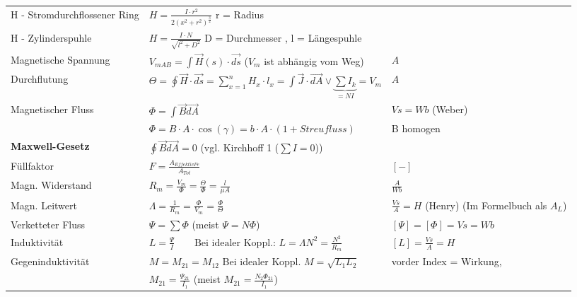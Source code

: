 \begin{tabular}[c]{ | p{5cm} | p{8cm} | p{4cm} | }
            H - Stromdurchflossener Ring & $ H =  \frac{I \cdot r^2}{2(x^2+r^2)^{\frac{3}{2}}}$ r = Radius &  \\
            H - Zylinderspuhle & $ H = \frac{I \cdot N}{\sqrt{l^2 + D^2}}$ D = Durchmesser , l = Längespuhle & \\
            Magnetische Spannung &
            $V_{mAB} = \int\limits \vec{H}(s) \cdot \vec{ds}$ ($V_m$ ist abhängig vom Weg) &
            $A$ \\
            \hline
            Durchflutung &
            $\Theta = \oint\vec{H} \cdot \vec{ds} = \sum\limits_{x=1}^n H_x \cdot l_x = \int\limits \vec{J} \cdot \vec{dA} \vee \underbrace{\sum I_k}_{= N I} = V_m$ &
            $A$ \\
            \hline
            Magnetischer Fluss &
            $\Phi = \int \vec{B} \vec{dA}$ &
            $Vs = Wb$ (Weber) \\
            &
            $\Phi = B \cdot A \cdot \cos(\gamma)=b \cdot A \cdot (1+Streufluss)$ &
            B homogen \\
            \hline
            \textbf{Maxwell-Gesetz} &
            $\oint \vec{B} \vec{dA} = 0$ (vgl. Kirchhoff 1 ($\sum I = 0$)) &
            \\
            \hline
            Füllfaktor &
            $F=\frac{A_{Effektiv Fe}}{A_{Tot}}$ &
            $[-]$ \\
            \hline
            Magn. Widerstand &
            $R_m = \frac{V_m}{\Phi} = \frac{\Theta}{\Phi} = \frac{l}{\mu A} $ &
            $\frac{A}{Wb}$ \\
            \hline
            Magn. Leitwert &
            $\Lambda = \frac{1}{R_m} = \frac{\Phi}{V_m}=\frac{\Phi}{\Theta}$ &
            $\frac{Vs}{A} = H$ (Henry) (Im Formelbuch als $A_L$) \\
            \hline
            Verketteter Fluss &
            $\Psi = \sum \Phi $ (meist $\Psi = N \Phi$) &
            $[\Psi] = [\Phi] = Vs = Wb$ \\
            \hline
            Induktivität &
            $L = \frac{\Psi}{I}  \qquad \text{Bei idealer Koppl.: } L = \Lambda N^2 = \frac{N^2}{R_m} $ &
            $[L] = \frac{Vs}{A} = H$ \\
            \hline
            Gegeninduktivität &
            $M = M_{21} = M_{12}$ Bei idealer Koppl. $M = \sqrt{L_1 L_2}$ &
            vorder Index = Wirkung, \\
            &
            $M_{21} = \frac{\Psi_{21}}{I_1}$  (meist $M_{21} = \frac{N_2 \Phi_{21}}{I_1}$) &

\end{tabular}
